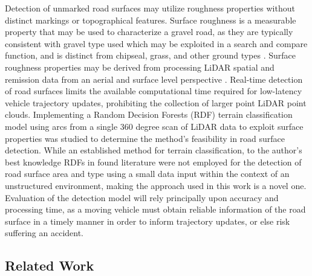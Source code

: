 \documentclass[journal,onecolumn]{IEEEtran}
\begin{document}
	{Detection of unmarked road surfaces may utilize roughness properties without distinct markings or topographical features. Surface roughness is a measurable property that may be used to characterize a gravel road, as they are typically consistent with gravel type used \cite{skorseth_gravel_nodate} which may be exploited in a search and compare function, and is distinct from chipseal, grass, and other ground types \cite{wan_road_2007, levi_3d_2012_light, levi_3d_2012_terrain}. Surface roughness properties may be derived from processing LiDAR spatial and remission data from an aerial and surface level perspective \cite{wan_road_2007, levi_3d_2012_light, levi_3d_2012_terrain, pollyea_experimental_2012,rychkov_computational_2012,lague_accurate_2013,brubaker_use_2013,turner_estimation_2014,campbell_lidar-based_2017,shepard_roughness_2001,tegowski_statistical_2016,sock_probabilistic_2016,milenkovic_roughness_2018,yadav_extraction_2017, yadav_rural_2018}. Real-time detection of road surfaces limits the available computational time required for low-latency vehicle trajectory updates, prohibiting the collection of larger point LiDAR point clouds. Implementing a Random Decision Forests (RDF) terrain classification model using arcs from a single 360 degree scan of LiDAR data to exploit surface properties was studied to determine the method's feasibility in road surface detection. While an established method for terrain classification, to the author's best knowledge RDFs in found literature were not employed for the detection of road surface area and type using a small data input within the context of an unstructured environment, making the approach used in this work is a novel one. Evaluation of the detection model will rely principally upon accuracy and processing time, as a moving vehicle must obtain reliable information of the road surface in a timely manner in order to inform trajectory updates, or else risk suffering an accident.}
	
	\subsection{Related Work}
	
\end{document}
